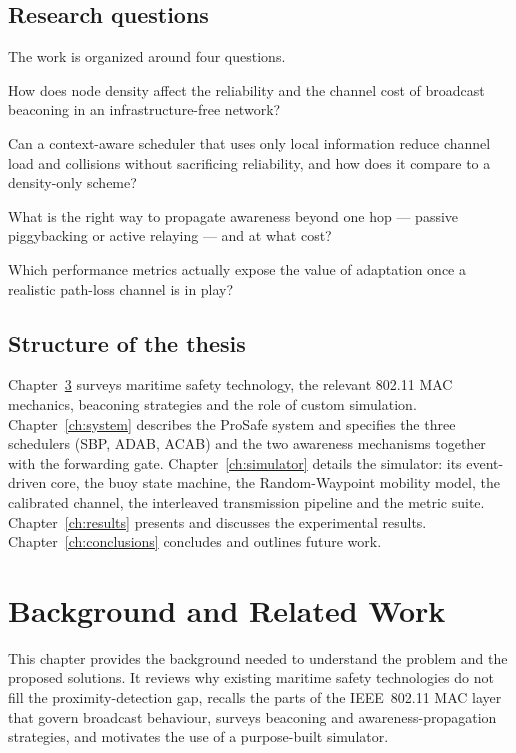 \documentclass[12pt,a4paper,oneside]{report}
\begin{document}
\section{Research questions}
The work is organized around four questions.
\begin{description}[leftmargin=2em,style=nextline]
  \item[RQ1] How does node density affect the reliability and the channel cost
  of broadcast beaconing in an infrastructure-free network?
  \item[RQ2] Can a context-aware scheduler that uses only local information
  reduce channel load and collisions without sacrificing reliability, and how
  does it compare to a density-only scheme?
  \item[RQ3] What is the right way to propagate awareness beyond one hop ---
  passive piggybacking or active relaying --- and at what cost?
  \item[RQ4] Which performance metrics actually expose the value of adaptation
  once a realistic path-loss channel is in play?
\end{description}

\section{Structure of the thesis}
Chapter~\ref{ch:background} surveys maritime safety technology, the relevant
802.11 MAC mechanics, beaconing strategies and the role of custom simulation.
Chapter~\ref{ch:system} describes the ProSafe system and specifies the three
schedulers (SBP, ADAB, ACAB) and the two awareness mechanisms together with the
forwarding gate. Chapter~\ref{ch:simulator} details the simulator: its
event-driven core, the buoy state machine, the Random-Waypoint mobility model,
the calibrated channel, the interleaved transmission pipeline and the metric
suite. Chapter~\ref{ch:results} presents and discusses the experimental
results. Chapter~\ref{ch:conclusions} concludes and outlines future work.

\chapter{Background and Related Work}
\label{ch:background}

This chapter provides the background needed to understand the problem and the
proposed solutions. It reviews why existing maritime safety technologies do not
fill the proximity-detection gap, recalls the parts of the IEEE~802.11 MAC layer
that govern broadcast behaviour, surveys beaconing and awareness-propagation
strategies, and motivates the use of a purpose-built simulator.
\end{document}
